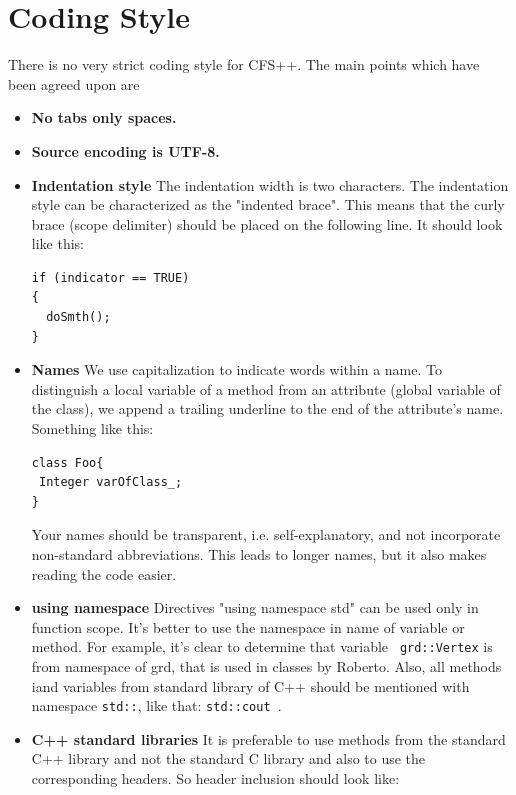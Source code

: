 \section{Coding Style}

There is  no very strict  coding style for CFS++.  The main points  which have
been agreed upon are
\begin{itemize}

\item \textbf{No tabs only spaces.}

\item \textbf{Source encoding is UTF-8.}

\item \textbf{Indentation style} The indentation  width is two characters. The
  indentation style can be characterized  as the "indented brace".  This means
  that the  curly brace (scope  delimiter) should  be placed on  the following
  line. It should look like this:
\begin{verbatim}
if (indicator == TRUE)
{
  doSmth();
}
\end{verbatim}
\item \textbf{Names} We use capitalization to indicate words within a name. To
  distinguish a local variable of a  method from an attribute (global variable
  of the class), we append a trailing  underline to the end of the attribute's
  name. Something like this:
\begin{verbatim}
class Foo{
 Integer varOfClass_;
}
\end{verbatim}
     Your  names  should  be   transparent,  i.e.  self-explanatory,  and  not
     incorporate non-standard  abbreviations. This leads to  longer names, but
     it also makes reading the code easier.
\item \textbf{using  namespace} Directives "using  namespace std" can  be used
  only in function scope. It's better to use the namespace in name of variable
  or  method.  For  example,  it's  clear  to  determine  that  variable  {\tt
    grd::Vertex}  is  from namespace  of  grd,  that  is  used in  classes  by
  Roberto. Also,  all methods  iand variables from  standard library  of {C++}
  should be mentioned with namespace {\tt std::}, like that: {\tt std::cout }.
\item \textbf{C++ standard libraries} It is preferable to use methods from the
  standard C++  library and  not the standard  C library and  also to  use the
  corresponding headers. So header inclusion should look like:
\begin{verbatim}

\end{verbatim}
\end{itemize}
